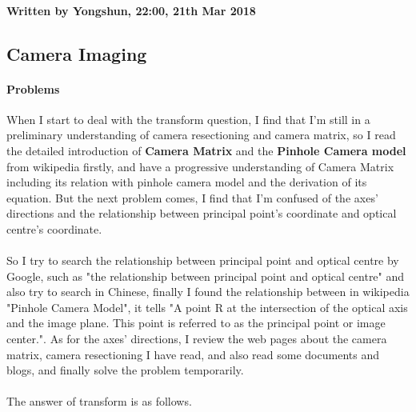 \documentclass{article}
\begin{document}
\paragraph{Written by Yongshun, 22:00, 21th Mar 2018}

\subsection{Camera Imaging}
\paragraph{Problems}When I start to deal with the transform question, I find that I'm still in a preliminary understanding of camera resectioning and camera matrix, so I read the detailed introduction of \textbf{Camera Matrix}\cite{CameraMatrix} and the \textbf{Pinhole Camera model}\cite{Pinhole} from wikipedia firstly, and have a progressive understanding of Camera Matrix including its relation with pinhole camera model and the derivation of its equation. But the next problem comes, I find that I'm confused of the axes' directions and the relationship between principal point's coordinate and optical centre's coordinate.
\paragraph{}So I try to search the relationship between principal point and optical centre by Google, such as "the relationship between principal point and optical centre" and also try to search in Chinese, finally I found the relationship between in wikipedia "Pinhole Camera Model"\cite{Pinhole}, it tells "A point R at the intersection of the optical axis and the image plane. This point is referred to as the principal point or image center.". As for the axes' directions, I review the web pages about the camera matrix, camera resectioning I have read, and also read some documents and blogs\cite{COMP}\cite{csdn1}\cite{zhopencv}, and finally solve the problem temporarily.
\paragraph{}The answer of transform is as follows.
\\
\end{document}
